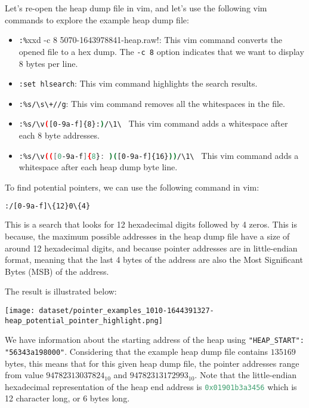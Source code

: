     \begin{minipage}{\dimexpr\linewidth-20pt}
        Let's re-open the heap dump file in vim, and let's use the following vim commands to explore the example heap dump file:

        \begin{itemize} 
            \item \lstinline[language=bash]!:%!xxd -c 8  5070-1643978841-heap.raw!: This vim command converts the opened file to a hex dump. The \lstinline[language=bash]!-c 8! option indicates that we want to display 8 bytes per line.
            \item \lstinline[language=bash]!:set hlsearch!: This vim command highlights the search results.
            \item \lstinline[language=bash]!:%s/\s\+//g!: This vim command removes all the whitespaces in the file.
            \item \lstinline[language=bash]!:%s/\v([0-9a-f]{8}:)/\1\ ! This vim command adds a whitespace after each 8 byte addresses.
            \item \lstinline[language=bash]!:%s/\v(([0-9a-f]{8}: )([0-9a-f]{16}))/\1\ ! This vim command adds a whitespace after each heap dump byte line.
        \end{itemize}
    \end{minipage}

    To find potential pointers, we can use the following command in vim:
    \begin{lstlisting}[language=bash, caption={Vim command to find potential pointers}]
        :/[0-9a-f]\{12}0\{4}
    \end{lstlisting}

    This is a search that looks for 12 hexadecimal digits followed by 4 zeros. This is because, the maximum possible addresses in the heap dump file have a size of around 12 hexadecimal digits, and because pointer addresses are in little-endian format, meaning that the last 4 bytes of the address are also the Most Significant Bytes (MSB) of the address. 
    
    The result is illustrated below:

    \texttt{[image: dataset/pointer\_examples\_1010-1644391327-heap\_potential\_pointer\_highlight.png]}

    We have information about the starting address of the heap using \lstinline[style=json]!"HEAP_START": "56343a198000"!. Considering that the example heap dump file contains $ 135169 $ bytes, this means that for this given heap dump file, the pointer addresses range from value $ 94782313037824_{10} $ and $ 94782313172993_{10} $. Note that the little-endian hexadecimal representation of the heap end address is \lstinline[language=c]!0x01901b3a3456! which is 12 character long, or 6 bytes long.


